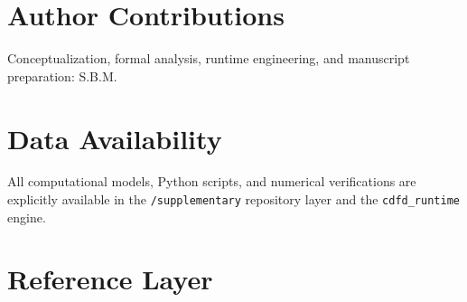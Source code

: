 \documentclass[11pt]{article}
\begin{document}
\section*{Author Contributions} Conceptualization, formal analysis, runtime engineering, and manuscript preparation: S.B.M.
\section*{Data Availability} All computational models, Python scripts, and numerical verifications are explicitly available in the \texttt{/supplementary} repository layer and the \texttt{cdfd\_runtime} engine.

\section{Reference Layer}


\end{document}
